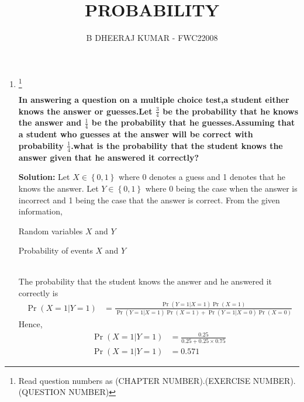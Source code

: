 \documentclass{article}
\providecommand{\cbrak}[1]{\ensuremath{\left\{#1\right\}}}
\providecommand{\pr}[1]{\ensuremath{\Pr\left(#1\right)}}
\begin{document}
\title{PROBABILITY}
\author{\Large B DHEERAJ KUMAR - FWC22008}
\date{}

\maketitle
\begin{enumerate}[label=13.\arabic{enumi}.\arabic{enumii}]%
\setcounter{enumi}{2}
\setcounter{enumii}{4}
\item \footnote{Read question numbers as (CHAPTER NUMBER).(EXERCISE NUMBER).(QUESTION NUMBER)}
\begin{flushleft}
\textbf{In answering a question on a multiple choice test,a student either knows the answer or guesses.Let $\frac{3}{4}$ be the probability that he knows the answer and $\frac{1}{4}$ be the probability that he guesses.Assuming that a student who guesses at the answer will be correct with probability $\frac{1}{4}$.what is the probability that the student knows the answer given that he answered it correctly?}
\end{flushleft}
\textbf{Solution:}
Let $X \in \cbrak{0,1}$ where 0 denotes a guess and 1 denotes that he knows the answer. Let $Y \in \cbrak{0,1}$ where 0 being the case when the answer is incorrect and 1 being the  case that the answer is correct.
From the given information,
\centering
\begin{table}[h]

	 \caption{Random variables $X$ and $Y$}\label{table:2}   
\end{table}
\centering
\begin{table}[h]
	
	\caption{Probability of events $X$ and $Y$}\label{table:1} 
\end{table}
\\
The probability that the student knows the answer and he answered it correctly is \\
{\footnotesize
\begin{align*}
\pr{X=1|Y=1} &=\frac{\pr{Y=1|X=1}\pr{X=1}}{\pr{Y=1|X=1}\pr{X=1}+\pr{Y=1|X=0}\pr{X=0}}
\end{align*}
}
Hence,
\begin{align*}
\pr{X=1|Y=1}&=\frac{0.25}{{0.25}+{0.25\times 0.75}}
\\
\pr{X=1|Y=1}&=0.571
\end{align*}

\end{enumerate}
\end{document}
